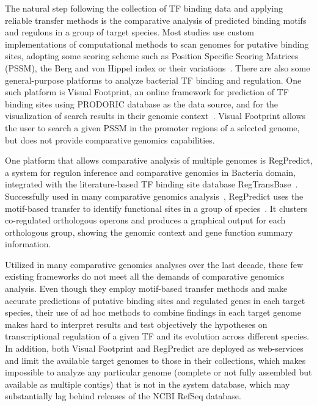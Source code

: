 The natural step following the collection of TF binding data and applying
reliable transfer methods is the comparative analysis of predicted binding
motifs and regulons in a group of target species. Most studies use custom
implementations of computational methods to scan genomes for putative binding
sites, adopting some scoring scheme such as Position Specific Scoring Matrices
(PSSM), the Berg and von Hippel index or their
variations~\citep{schneider1986information, berg1988selection,
  osada2004comparative, beckstette2006fast}. There are also some
general-purpose platforms to analyze bacterial TF binding and regulation. One
such platform is Visual Footprint, an online framework for prediction of TF
binding sites using PRODORIC database as the data source, and for the
visualization of search results in their genomic
context~\citep{munch2005virtual, munch2003prodoric}. Visual Footprint allows the
user to search a given PSSM in the promoter regions of a selected genome, but
does not provide comparative genomics capabilities.

One platform that allows comparative analysis of multiple genomes is
RegPredict, a system for regulon inference and comparative genomics in Bacteria
domain, integrated with the literature-based TF binding site database
RegTransBase~\citep{novichkov2010regpredict,
  kazakov2007regtransbase}. Successfully used in many comparative genomics
analysis~\citep{ravcheev2012transcriptional, antunes2012global,
  novichkov2013regprecise, galperin2014comparative}, RegPredict uses the
motif-based transfer to identify
functional sites in a group of species~\citep{kilic2015assessment}. It clusters
co-regulated orthologous operons and produces a graphical output for each
orthologous group, showing the genomic context and gene function summary
information.

Utilized in many comparative genomics analyses over the last decade, these few
existing frameworks do not meet all the demands of comparative genomics
analysis. Even though they employ motif-based transfer methods and make
accurate predictions of putative binding sites and regulated genes in each
target species, their use of ad hoc methods to combine findings in each target
genome makes hard to interpret results and test objectively the hypotheses on
transcriptional regulation of a given TF and its evolution across different
species. In addition, both Visual Footprint and RegPredict are deployed as
web-services and limit the available target genomes to those in their
collections, which makes impossible to analyze any particular genome
(complete or not fully assembled but available as multiple contigs) that is not
in the system database, which may substantially lag behind releases of the NCBI
RefSeq database.

